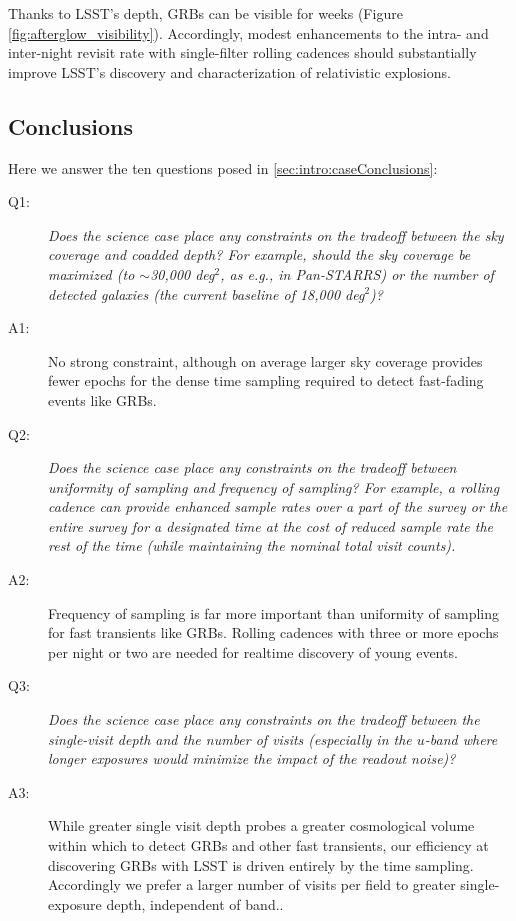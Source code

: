 Thanks to LSST's depth, GRBs can be visible for weeks (Figure
\ref{fig:afterglow_visibility}).  Accordingly,
modest enhancements to the intra- and inter-night revisit rate with
single-filter rolling cadences should substantially improve LSST's
discovery and characterization of relativistic explosions.


\subsection{Conclusions}

Here we answer the ten questions posed in
\autoref{sec:intro:caseConclusions}:

\begin{description}

\item[Q1:] {\it Does the science case place any constraints on the
tradeoff between the sky coverage and coadded depth? For example, should
the sky coverage be maximized (to $\sim$30,000 deg$^2$, as e.g., in
Pan-STARRS) or the number of detected galaxies (the current baseline 
of 18,000 deg$^2$)?}

\item[A1:] No strong constraint, although on average
	larger sky coverage provides fewer epochs for the dense time sampling
	required to detect fast-fading events like GRBs.

\item[Q2:] {\it Does the science case place any constraints on the
tradeoff between uniformity of sampling and frequency of  sampling? For
example, a rolling cadence can provide enhanced sample rates over a part
of the survey or the entire survey for a designated time at the cost of
reduced sample rate the rest of the time (while maintaining the nominal
total visit counts).}

\item[A2:]  Frequency of sampling is far more important than uniformity of
	sampling for fast transients like GRBs.  Rolling cadences with
		three or more epochs per night or two are needed for
		realtime discovery of young events.

\item[Q3:] {\it Does the science case place any constraints on the
tradeoff between the single-visit depth and the number of visits
(especially in the $u$-band where longer exposures would minimize the
impact of the readout noise)?}

\item[A3:]  While greater single visit depth probes a greater cosmological
	volume within which to detect GRBs and other fast transients,
		our efficiency at discovering
		GRBs with LSST is driven entirely by the time sampling.
		Accordingly we prefer a larger number of visits per field
		to greater single-exposure depth, independent of band..


\end{description}
